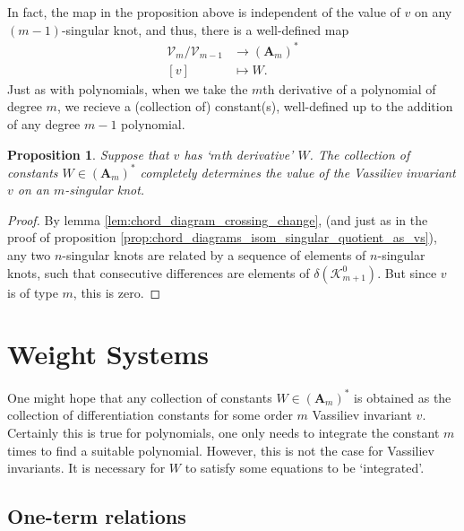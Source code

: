 \documentclass[12pt]{report}
\theoremstyle{regular}
\numberwithin{clause}{chapter}
\newtheorem{proposition}[clause]{Proposition}
\begin{document}
        In fact, the map in the proposition above is independent of the value of \(v\) on any \((m - 1)\)-singular knot, and thus, there is a well-defined map
        \begin{align*}
                \mathcal{V}_{m} / \mathcal{V}_{m - 1} &\longrightarrow (\mathbf{A}_{m})^{\ast} \\
                [v]             & \longmapsto W.
        \end{align*}
        Just as with polynomials, when we take the \(m\)th derivative of a polynomial of degree \(m\), we recieve a (collection of) constant(s), well-defined up to the addition of any degree \(m - 1\) polynomial.

        \begin{proposition}
                Suppose that \(v\) has `\(m\)th derivative' \(W\). The collection of constants \(W \in (\mathbf{A}_{m})^{\ast}\) completely determines the value of the Vassiliev invariant \(v\) on an \(m\)-singular knot.
        \end{proposition}

        \begin{proof}
                By lemma \ref{lem:chord_diagram_crossing_change}, (and just as in the proof of proposition \ref{prop:chord_diagrams_isom_singular_quotient_as_vs}), any two \(n\)-singular knots are related by a sequence of elements of \(n\)-singular knots, such that consecutive differences are elements of \(\delta(\mathcal{K}^{0}_{m + 1})\). But since \(v\) is of type \(m\), this is zero.
        \end{proof}


        \section{Weight Systems}

        One might hope that any collection of constants \(W \in (\mathbf{A}_{m})^{\ast}\) is obtained as the collection of differentiation constants for some order \(m\) Vassiliev invariant \(v\). Certainly this is true for polynomials, one only needs to integrate the constant \(m\) times to find a suitable polynomial. However, this is not the case for Vassiliev invariants. It is necessary for \(W\) to satisfy some equations to be `integrated'.

        \subsection{One-term relations}
\end{document}
